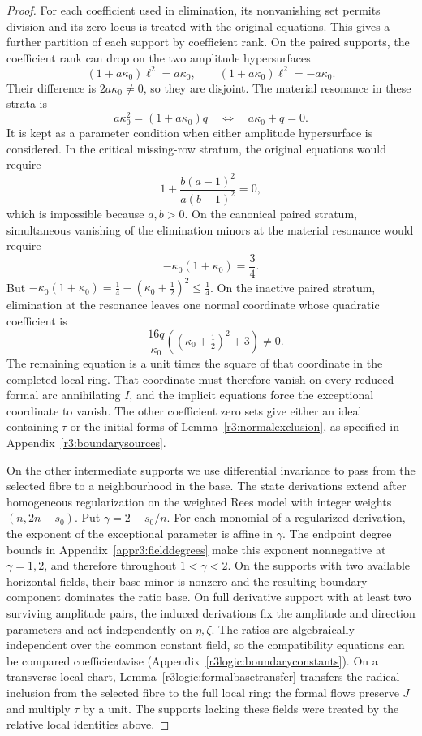 \documentclass[11pt,a4paper]{article}
\numberwithin{equation}{section}
\theoremstyle{plain}
\theoremstyle{definition}
\theoremstyle{remark}
\begin{document}
\begin{proof}
For each coefficient used in elimination, its nonvanishing set permits
division and its zero locus is treated with the original equations.
This gives a further partition of each support by coefficient rank.
On the paired supports, the coefficient rank can drop on the
two amplitude hypersurfaces
\[
 (1+a\kappa_0)\ell^2=a\kappa_0,
 \qquad (1+a\kappa_0)\ell^2=-a\kappa_0.
\]
Their difference is $2a\kappa_0\ne0$, so they are disjoint.
The material resonance in these strata is
\[
 a\kappa_0^2=(1+a\kappa_0)q
 \quad\Longleftrightarrow\quad a\kappa_0+q=0.
\]
It is kept as a parameter condition when either amplitude
hypersurface is considered. In the critical missing-row stratum,
the original equations would require
\[
 1+\frac{b(a-1)^2}{a(b-1)^2}=0,
\]
which is impossible because $a,b>0$. On the canonical paired
stratum, simultaneous vanishing of the elimination minors at
the material resonance would require
\[
 -\kappa_0(1+\kappa_0)=\frac34.
\]
But $-\kappa_0(1+\kappa_0)=\frac14-(\kappa_0+\frac12)^2\le\frac14$.
On the inactive paired stratum, elimination at the resonance leaves
one normal coordinate whose quadratic coefficient is
\[
 -\frac{16q}{\kappa_0}
       \left((\kappa_0+\tfrac12)^2+3\right)\ne0.
\]
The remaining equation is a unit times the square of that coordinate
in the completed local ring. That coordinate must therefore vanish on
every reduced formal arc annihilating $I$, and the implicit equations force the exceptional coordinate
to vanish. The other coefficient zero sets give either an ideal
containing $\tau$ or the initial forms of
Lemma~\ref{r3:normalexclusion}, as specified in
Appendix~\ref{r3:boundarysources}.

On the other intermediate supports we use differential invariance
to pass from the selected fibre to a neighbourhood in the base.
The state derivations extend after homogeneous regularization on
the weighted Rees model with integer weights $(n,2n-s_0)$. Put
$\gamma=2-s_0/n$. For each monomial of a regularized derivation, the
exponent of the exceptional parameter is affine in $\gamma$.
The endpoint degree bounds in Appendix~\ref{appr3:fielddegrees}
make this exponent nonnegative at $\gamma=1,2$, and therefore
throughout $1<\gamma<2$.
On the supports with two available horizontal fields, their base
minor is nonzero and the resulting boundary component dominates
the ratio base. On full derivative support with at least two surviving
amplitude pairs, the induced derivations fix the amplitude and direction
parameters and act independently on
$\eta,\zeta$. The ratios are algebraically independent over the
common constant field, so the compatibility equations can be compared
coefficientwise (Appendix~\ref{r3logic:boundaryconstants}).
On a transverse local chart, Lemma~\ref{r3logic:formalbasetransfer}
transfers the radical inclusion from the selected fibre to the full
local ring: the formal flows preserve $J$ and multiply $\tau$ by
a unit. The supports lacking these fields were treated by the
relative local identities above.


\end{proof}
\end{document}

